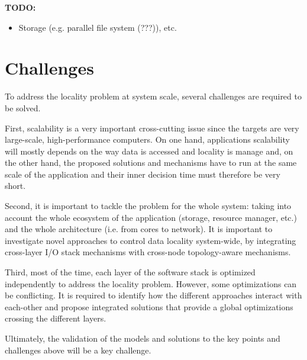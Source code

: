 {\bf TODO:}  
\begin{itemize}
\item Storage (e.g. parallel file system (???)), etc. 
\end{itemize}

\section{Challenges}
To address the locality problem at system scale, several challenges are required
to be solved. 

First, scalability is a very important cross-cutting issue since the targets are
very large-scale, high-performance computers. On one hand, applications
scalability will mostly depends on the way data is accessed and locality is
manage and, on the other hand, the proposed solutions and mechanisms have to run
at the same scale of the application and their inner decision time must
therefore be very short.

Second, it is important to tackle the problem for the whole system: taking into account
the whole ecosystem of the application (storage, resource manager, etc.) and the
whole architecture (i.e. from cores to network). It is important to investigate
novel approaches to control data locality system-wide, by integrating
cross-layer I/O stack mechanisms  with cross-node topology-aware mechanisms. 

Third, most of the time, each layer of the software stack is optimized
independently to address the locality problem. However, some optimizations can
be conflicting. It is required to identify how the different approaches interact
with each-other and propose integrated solutions that provide a global
optimizations crossing the different layers.

Ultimately, the validation of the models and solutions to the key points and challenges above 
will be a key challenge.
